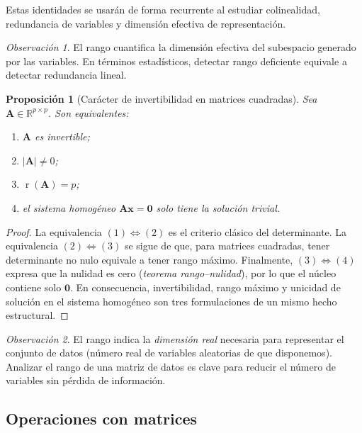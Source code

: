 \documentclass[12pt, a4paper]{article}
\theoremstyle{plain}
\newtheorem{proposicion}[teorema]{Proposición}
\theoremstyle{definition}
\theoremstyle{remark}
\newtheorem*{observacion}{Observación}
\newcommand{\R}{\mathbb{R}}
\newcommand{\mat}[1]{\mathbf{#1}}
\newcommand{\rg}{\operatorname{r}}
\begin{document}
Estas identidades se usarán de forma recurrente al estudiar colinealidad,
redundancia de variables y dimensión efectiva de representación.

\begin{observacion}
El rango cuantifica la dimensión efectiva del subespacio generado por las
variables. En términos estadísticos, detectar rango deficiente equivale a
detectar redundancia lineal.
\end{observacion}

\begin{proposicion}[Carácter de invertibilidad en matrices cuadradas]
Sea $\mat{A}\in\R^{p\times p}$. Son equivalentes:
\begin{enumerate}
  \item $\mat{A}$ es invertible;
  \item $|\mat{A}|\neq 0$;
  \item $\rg(\mat{A})=p$;
  \item el sistema homogéneo $\mat{A}\mathbf{x}=\mathbf{0}$ solo tiene la
        solución trivial.
\end{enumerate}
\end{proposicion}

\begin{proof}
La equivalencia $(1)\Leftrightarrow(2)$ es el criterio clásico del
determinante. La equivalencia $(2)\Leftrightarrow(3)$ se sigue de que, para
matrices cuadradas, tener determinante no nulo equivale a tener rango máximo.
Finalmente, $(3)\Leftrightarrow(4)$ expresa que la nulidad es cero
(\emph{teorema rango--nulidad}), por lo que el núcleo contiene solo
$\mathbf{0}$. En consecuencia, invertibilidad, rango máximo y unicidad de
solución en el sistema homogéneo son tres formulaciones de un mismo hecho
estructural.
\end{proof}

\begin{observacion}
El rango indica la \emph{dimensión real} necesaria para representar el
conjunto de datos (número real de variables aleatorias de que disponemos).
Analizar el rango de una matriz de datos es clave para reducir el número de
variables sin pérdida de información.
\end{observacion}

\subsection{Operaciones con matrices}
\end{document}
